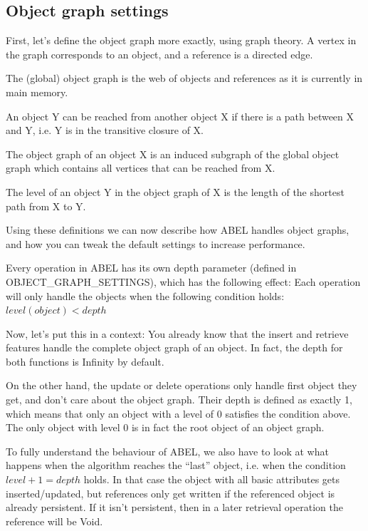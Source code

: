 \subsection{Object graph settings}
\label{subsection:obect_graph_settings}

First, let's define the object graph more exactly, using graph theory.
A vertex in the graph corresponds to an object, and a reference is a directed edge.

The (global) object graph is the web of objects and references as it is currently in main memory.

An object Y can be reached from another object X if there is a path between X and Y, i.e. Y is in the transitive closure of X.

The object graph of an object X is an induced subgraph of the global object graph which contains all vertices that can be reached from X.

The level of an object Y in the object graph of X is the length of the shortest path from X to Y.

Using these definitions we can now describe how ABEL handles object graphs, and how you can tweak the default settings to increase performance.

Every operation in ABEL has its own depth parameter (defined in OBJECT\_GRAPH\_SETTINGS), which has the following effect:
Each operation will only handle the objects when the following condition holds: $ level(object) < depth $ 

Now, let's put this in a context:
You already know that the insert and retrieve features handle the complete object graph of an object. 
In fact, the depth for both functions is Infinity by default.

On the other hand, the update or delete operations only handle first object they get, and don't care about the object graph.
Their depth is defined as exactly 1, which means that only an object with a level of 0 satisfies the condition above.
The only object with level 0 is in fact the root object of an object graph.

To fully understand the behaviour of ABEL, we also have to look at what happens when the algorithm reaches the ``last'' object, i.e. when the condition $level + 1 = depth$ holds.
In that case the object with all basic attributes gets inserted/updated, but references only get written if the referenced object is already persistent.
If it isn't persistent, then in a later retrieval operation the reference will be Void.

